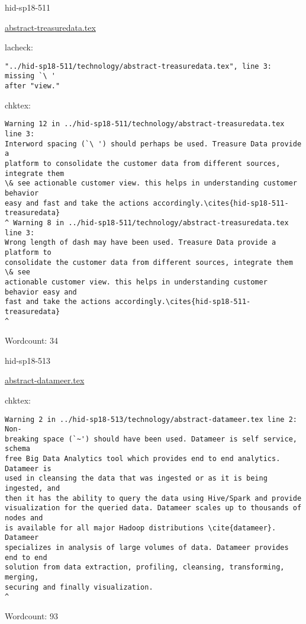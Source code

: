 \begin{IU}

hid-sp18-511

\href{https://github.com/cloudmesh-community/hid-sp18-511/blob/master//technology/abstract-treasuredata.tex}{abstract-treasuredata.tex}

 
lacheck:
\begin{tiny}
\begin{verbatim}
"../hid-sp18-511/technology/abstract-treasuredata.tex", line 3: missing `\ '
after "view."
\end{verbatim}
\end{tiny}
chktex:
\begin{tiny}
\begin{verbatim}
Warning 12 in ../hid-sp18-511/technology/abstract-treasuredata.tex line 3:
Interword spacing (`\ ') should perhaps be used. Treasure Data provide a
platform to consolidate the customer data from different sources, integrate them
\& see actionable customer view. this helps in understanding customer behavior
easy and fast and take the actions accordingly.\cites{hid-sp18-511-treasuredata}
^ Warning 8 in ../hid-sp18-511/technology/abstract-treasuredata.tex line 3:
Wrong length of dash may have been used. Treasure Data provide a platform to
consolidate the customer data from different sources, integrate them \& see
actionable customer view. this helps in understanding customer behavior easy and
fast and take the actions accordingly.\cites{hid-sp18-511-treasuredata}
^
\end{verbatim}
\end{tiny}

Wordcount: 34

\end{IU}



\begin{IU}

hid-sp18-513

\href{https://github.com/cloudmesh-community/hid-sp18-513/blob/master//technology/abstract-datameer.tex}{abstract-datameer.tex}

 
chktex:
\begin{tiny}
\begin{verbatim}
Warning 2 in ../hid-sp18-513/technology/abstract-datameer.tex line 2: Non-
breaking space (`~') should have been used. Datameer is self service, schema
free Big Data Analytics tool which provides end to end analytics. Datameer is
used in cleansing the data that was ingested or as it is being ingested, and
then it has the ability to query the data using Hive/Spark and provide
visualization for the queried data. Datameer scales up to thousands of nodes and
is available for all major Hadoop distributions \cite{datameer}. Datameer
specializes in analysis of large volumes of data. Datameer provides end to end
solution from data extraction, profiling, cleansing, transforming, merging,
securing and finally visualization.
^
\end{verbatim}
\end{tiny}

Wordcount: 93

\end{IU}

